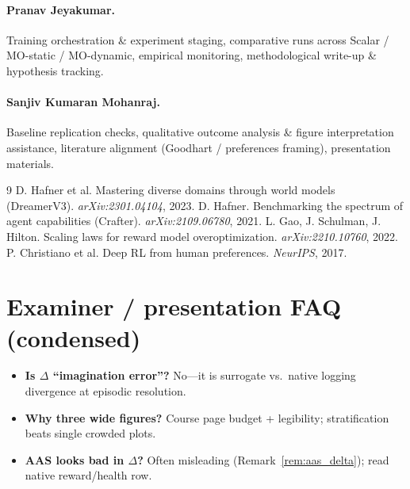 \documentclass[10pt,twocolumn]{article}
\theoremstyle{definition}
\begin{document}
\paragraph{Pranav Jeyakumar.}
Training orchestration \& experiment staging, comparative runs across Scalar / MO-static / MO-dynamic, empirical monitoring, methodological write-up \& hypothesis tracking.

\paragraph{Sanjiv Kumaran Mohanraj.}
Baseline replication checks, qualitative outcome analysis \& figure interpretation assistance, literature alignment (Goodhart / preferences framing), presentation materials.

\begin{thebibliography}{9}
 D. Hafner et al. Mastering diverse domains through world models (DreamerV3). \textit{arXiv:2301.04104}, 2023.
 D. Hafner. Benchmarking the spectrum of agent capabilities (Crafter). \textit{arXiv:2109.06780}, 2021.
 L. Gao, J. Schulman, J. Hilton. Scaling laws for reward model overoptimization. \textit{arXiv:2210.10760}, 2022.
 P. Christiano et al. Deep RL from human preferences. \textit{NeurIPS}, 2017.
\end{thebibliography}

\appendix
\section*{Examiner / presentation FAQ (condensed)}
\begin{itemize}[leftmargin=1.2em, itemsep=2pt]
  \item \textbf{Is \(\Delta\) ``imagination error''?} No---it is surrogate vs.\ native logging divergence at episodic resolution.
  \item \textbf{Why three wide figures?} Course page budget + legibility; stratification beats single crowded plots.
  \item \textbf{AAS looks bad in \(\Delta\)?} Often misleading (Remark~\ref{rem:aas_delta}); read native reward/health row.
\end{itemize}
\end{document}
